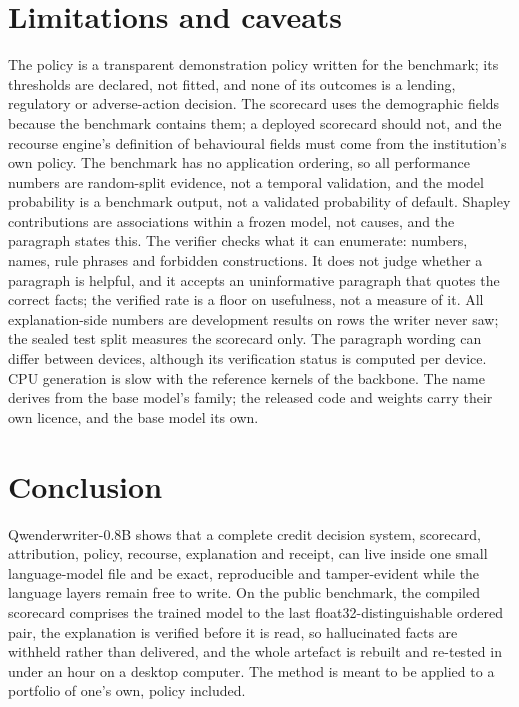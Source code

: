 \documentclass[twocolumn,10pt]{article}
\newcommand{\QW}{Qwenderwriter-0.8B}
\begin{document}
\section{Limitations and caveats}
\label{sec:limits}

The policy is a transparent demonstration policy written for the benchmark; its thresholds are declared, not fitted, and
none of its outcomes is a lending, regulatory or adverse-action decision. The scorecard uses the demographic fields because
the benchmark contains them; a deployed scorecard should not, and the recourse engine's definition of behavioural fields
must come from the institution's own policy. The benchmark has no application ordering, so all performance numbers are
random-split evidence, not a temporal validation, and the model probability is a benchmark output, not a validated
probability of default. Shapley contributions are associations within a frozen model, not causes, and the paragraph
states this. The verifier checks what it can enumerate: numbers, names, rule phrases and forbidden constructions. It does
not judge whether a paragraph is helpful, and it accepts an uninformative paragraph that quotes the correct facts; the verified rate
is a floor on usefulness, not a measure of it. All explanation-side numbers are development results on rows the writer
never saw; the sealed test split measures the scorecard only. The paragraph wording can differ between devices, although
its verification status is computed per device. CPU generation is slow with the reference kernels of the backbone. The
name derives from the base model's family; the released code and weights carry their own licence, and the base model its
own.

\section{Conclusion}

\QW{} shows that a complete credit decision system, scorecard, attribution, policy, recourse, explanation and receipt,
can live inside one small language-model file and be exact, reproducible and tamper-evident while the language layers
remain free to write. On the public benchmark, the compiled scorecard comprises the trained model to the last float32-distinguishable
ordered pair, the explanation is verified before it is read, so hallucinated facts are withheld rather than delivered, and the whole artefact is rebuilt and re-tested
in under an hour on a desktop computer. The method is meant to be applied to a portfolio of one's own, policy included.
\end{document}
